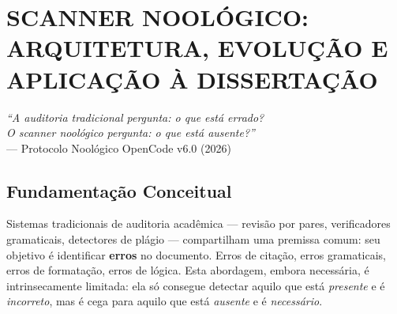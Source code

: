 
\chapter{SCANNER NOOLÓGICO: ARQUITETURA, EVOLUÇÃO E APLICAÇÃO À DISSERTAÇÃO}
\label{ap:scanner}

\begin{flushright}
\small\textit{``A auditoria tradicional pergunta: o que está errado?\\
O scanner noológico pergunta: o que está ausente?''}\\
--- Protocolo Noológico OpenCode v6.0 (2026)
\end{flushright}

\section{Fundamentação Conceitual}

Sistemas tradicionais de auditoria acadêmica --- revisão por pares, verificadores gramaticais, detectores de plágio --- compartilham uma premissa comum: seu objetivo é identificar \textbf{erros} no documento. Erros de citação, erros gramaticais, erros de formatação, erros de lógica. Esta abordagem, embora necessária, é intrinsecamente limitada: ela só consegue detectar aquilo que está \textit{presente} e é \textit{incorreto}, mas é cega para aquilo que está \textit{ausente} e é \textit{necessário}.

